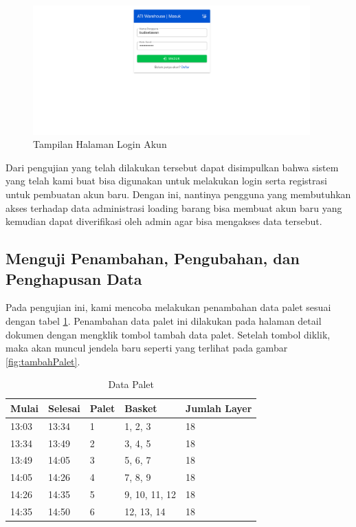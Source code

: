 \begin{figure} [ht!] \centering
  \includegraphics[width=0.95\textwidth]{gambar/login-akun.png}
  \caption{Tampilan Halaman Login Akun}
	\label{fig:loginAkun}
\end{figure}

Dari pengujian yang telah dilakukan tersebut dapat disimpulkan bahwa sistem yang telah kami buat bisa digunakan untuk melakukan login serta registrasi untuk pembuatan akun baru.
Dengan ini, nantinya pengguna yang membutuhkan akses terhadap data administrasi loading barang bisa membuat akun baru yang kemudian dapat diverifikasi oleh admin agar bisa mengakses data tersebut.
\vspace{0.5ex}

\subsection{Menguji Penambahan, Pengubahan, dan Penghapusan Data}
\vspace{1ex}

Pada pengujian ini, kami mencoba melakukan penambahan data palet sesuai dengan tabel \ref{tb:dataPalet}.
Penambahan data palet ini dilakukan pada halaman detail dokumen dengan mengklik tombol tambah data palet.
Setelah tombol diklik, maka akan muncul jendela baru seperti yang terlihat pada gambar \ref{fig:tambahPalet}.
\vspace{0.5ex}

\begin{longtable}{|l|l|l|l|l|}
	\caption{Data Palet}
	\label{tb:dataPalet}\\
  \hline
  \rowcolor[HTML]{C0C0C0}
  \textbf{Mulai} & \textbf{Selesai} & \textbf{Palet} & \textbf{Basket} & \textbf{Jumlah Layer} \\ \hline
	13:03 & 13:34 & 1 & 1, 2, 3 & 18 \\ \hline
	13:34 & 13:49 & 2 & 3, 4, 5 & 18 \\ \hline
	13:49 & 14:05 & 3 & 5, 6, 7 & 18 \\ \hline
	14:05 & 14:26 & 4 & 7, 8, 9 & 18 \\ \hline
	14:26 & 14:35 & 5 & 9, 10, 11, 12 & 18 \\ \hline
	14:35 & 14:50 & 6 & 12, 13, 14 & 18 \\ \hline
\end{longtable}

